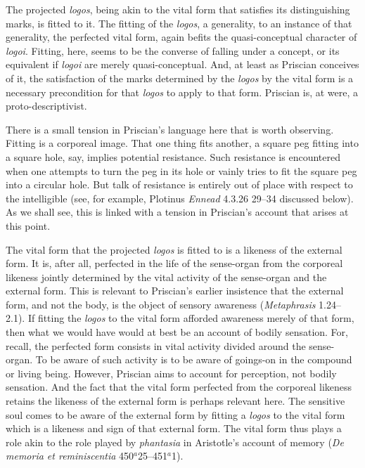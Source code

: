\documentclass[12pt]{article}
\begin{document}
The projected \emph{logos}, being akin to the vital form that satisfies its distinguishing marks, is fitted to it. The fitting of the \emph{logos}, a generality, to an instance of that generality, the perfected vital form, again befits the quasi-conceptual character of \emph{logoi}. Fitting, here, seems to be the converse of falling under a concept, or its equivalent if \emph{logoi} are merely quasi-conceptual. And, at least as Priscian conceives of it, the satisfaction of the marks determined by the \emph{logos} by the vital form is a necessary precondition for that \emph{logos} to apply to that form. Priscian is, at were, a proto-descriptivist. 

There is a small tension in Priscian's language here that is worth observing. Fitting is a corporeal image. That one thing fits another, a square peg fitting into a square hole, say, implies potential resistance. Such resistance is encountered when one attempts to turn the peg in its hole or vainly tries to fit the square peg into a circular hole. But talk of resistance is entirely out of place with respect to the intelligible (see, for example, Plotinus \emph{Ennead} 4.3.26 29–34 discussed below). As we shall see, this is linked with a tension in Priscian's account that arises at this point.

The vital form that the projected \emph{logos} is fitted to is a likeness of the external form. It is, after all, perfected in the life of the sense-organ from the corporeal likeness jointly determined by the vital activity of the sense-organ and the external form. This is relevant to Priscian's earlier insistence that the external form, and not the body, is the object of sensory awareness (\emph{Metaphrasis} 1.24--2.1). If fitting the \emph{logos} to the vital form afforded awareness merely of that form, then what we would have would at best be an account of bodily sensation. For, recall, the perfected form consists in vital activity divided around the sense-organ. To be aware of such activity is to be aware of goings-on in the compound or living being. However, Priscian aims to account for perception, not bodily sensation. And the fact that the vital form perfected from the corporeal likeness retains the likeness of the external form is perhaps relevant here. The sensitive soul comes to be aware of the external form by fitting a \emph{logos} to the vital form which is a likeness and sign of that external form. The vital form thus plays a role akin to the role played by \emph{phantasia} in Aristotle's account of memory (\emph{De memoria et reminiscentia} 450\( ^{a} \)25–451\( ^{a} \)1).
\end{document}
